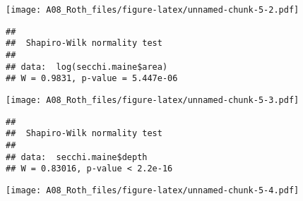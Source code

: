 \documentclass[]{article}
\newenvironment{Shaded}{\begin{snugshade}}{\end{snugshade}}
\newcommand{\KeywordTok}[1]{\textcolor[rgb]{0.13,0.29,0.53}{\textbf{#1}}}
\newcommand{\NormalTok}[1]{#1}
\newcommand{\OperatorTok}[1]{\textcolor[rgb]{0.81,0.36,0.00}{\textbf{#1}}}
\begin{document}
\texttt{[image: A08\_Roth\_files/figure-latex/unnamed-chunk-5-2.pdf]}

\begin{Shaded}
\end{Shaded}

\begin{verbatim}
## 
##  Shapiro-Wilk normality test
## 
## data:  log(secchi.maine$area)
## W = 0.9831, p-value = 5.447e-06
\end{verbatim}

\begin{Shaded}
\end{Shaded}

\texttt{[image: A08\_Roth\_files/figure-latex/unnamed-chunk-5-3.pdf]}

\begin{Shaded}
\end{Shaded}

\begin{verbatim}
## 
##  Shapiro-Wilk normality test
## 
## data:  secchi.maine$depth
## W = 0.83016, p-value < 2.2e-16
\end{verbatim}

\begin{Shaded}
\end{Shaded}

\texttt{[image: A08\_Roth\_files/figure-latex/unnamed-chunk-5-4.pdf]}

\begin{Shaded}
\end{Shaded}
\end{document}
